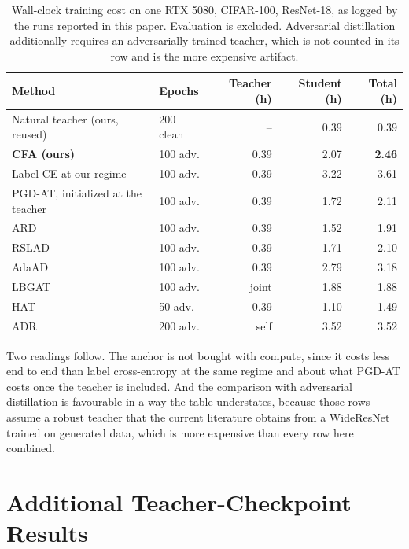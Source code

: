 \documentclass{article} %
\theoremstyle{plain}
\begin{document}
\begin{table}[!htbp]
  \centering \small \setlength{\tabcolsep}{5pt}
  \caption{Wall-clock training cost on one RTX 5080, CIFAR-100, ResNet-18, as logged by the runs
  reported in this paper. Evaluation is excluded. Adversarial distillation additionally requires an
  adversarially trained teacher, which is not counted in its row and is the more expensive artifact.}
  \label{tab:compute}
  \begin{tabular}{llrrr}
    \toprule
    Method & Epochs & Teacher (h) & Student (h) & Total (h) \\
    \midrule
    Natural teacher (ours, reused) & 200 clean & --   & 0.39 & 0.39 \\
    \midrule
    \textbf{CFA (ours)}            & 100 adv.  & 0.39 & 2.07 & \textbf{2.46} \\
    Label CE at our regime         & 100 adv.  & 0.39 & 3.22 & 3.61 \\
    PGD-AT, initialized at the teacher & 100 adv. & 0.39 & 1.72 & 2.11 \\
    ARD                            & 100 adv.  & 0.39 & 1.52 & 1.91 \\
    RSLAD                          & 100 adv.  & 0.39 & 1.71 & 2.10 \\
    AdaAD                          & 100 adv.  & 0.39 & 2.79 & 3.18 \\
    LBGAT                          & 100 adv.  & joint & 1.88 & 1.88 \\
    HAT                            & 50 adv.   & 0.39 & 1.10 & 1.49 \\
    ADR                            & 200 adv.  & self  & 3.52 & 3.52 \\
    \bottomrule
  \end{tabular}
\end{table}

Two readings follow. The anchor is not bought with compute, since it costs less end to end than label
cross-entropy at the same regime and about what PGD-AT costs once the teacher is included. And the
comparison with adversarial distillation is favourable in a way the table understates, because those
rows assume a robust teacher that the current literature obtains from a WideResNet trained on
generated data, which is more expensive than every row here combined.

\section{Additional Teacher-Checkpoint Results}
\label{app:teachersel}
\end{document}
